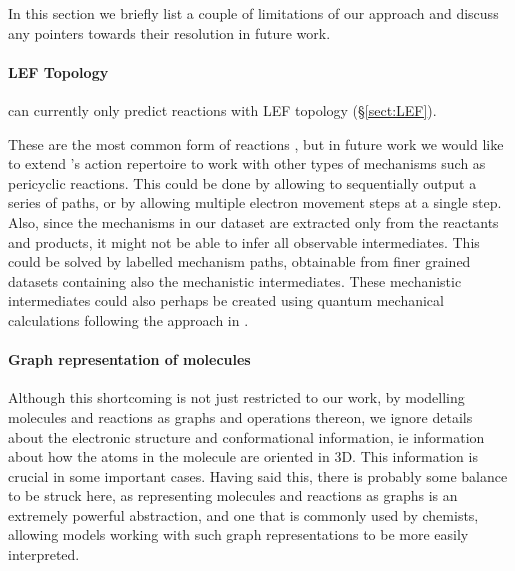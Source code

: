 
In this section we briefly list a couple of limitations of our approach and discuss any pointers towards their resolution in future work.

\paragraph{LEF Topology}

\ourModel can currently only predict reactions with LEF topology (\S \ref{sect:LEF}). 

These are the most common form of reactions \citep{herges1994organizing}, but in future work we would like to extend \ourModel's action repertoire to work with other types of mechanisms such as pericyclic reactions.
 This could be done by allowing \ourModel to sequentially output a series of paths, or by allowing multiple electron movement steps at a single step. 
 Also, since the mechanisms in our dataset are extracted only from the reactants and products, it might not be able to infer all observable intermediates. This could be solved by labelled mechanism paths, obtainable from finer grained datasets containing also the mechanistic intermediates. 
 These mechanistic intermediates could also perhaps be created using quantum mechanical calculations following the approach in \citet{Sadowski2016-qg}.
 
 \paragraph{Graph representation of molecules}

 Although this shortcoming is not just restricted to our work, by modelling molecules and reactions as graphs and operations thereon, we ignore details about the electronic structure and conformational information, ie information about how the atoms in the molecule are oriented in 3D. 
 This information is crucial in some important cases.
 Having said this, there is probably some balance to be struck here, as representing molecules and reactions as graphs is an extremely powerful abstraction, and one that is commonly used by chemists, allowing models working with such graph representations to be more easily interpreted.


 
 
